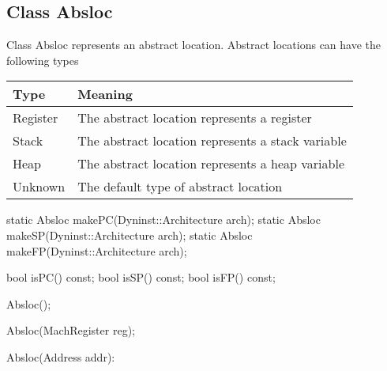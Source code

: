 \subsection{Class Absloc}
\label{sec:abslocs}


Class Absloc represents an abstract location. Abstract locations can have the
following types

\begin{center}
\begin{tabular}{ll}
\toprule
Type & Meaning \\
\midrule
Register &  The abstract location represents a register \\
Stack & The abstract location represents a stack variable \\
Heap  & The abstract location represents a heap variable \\
Unknown & The default type of abstract location \\
\bottomrule
\end{tabular}
\end{center}


\begin{apient}
static Absloc makePC(Dyninst::Architecture arch);
static Absloc makeSP(Dyninst::Architecture arch);
static Absloc makeFP(Dyninst::Architecture arch);
\end{apient}
  
\begin{apient}
bool isPC() const;
bool isSP() const;
bool isFP() const;
\end{apient}

\begin{apient}
Absloc();
\end{apient}

\begin{apient}
Absloc(MachRegister reg);
\end{apient}

\begin{apient}
Absloc(Address addr):
\end{apient}


